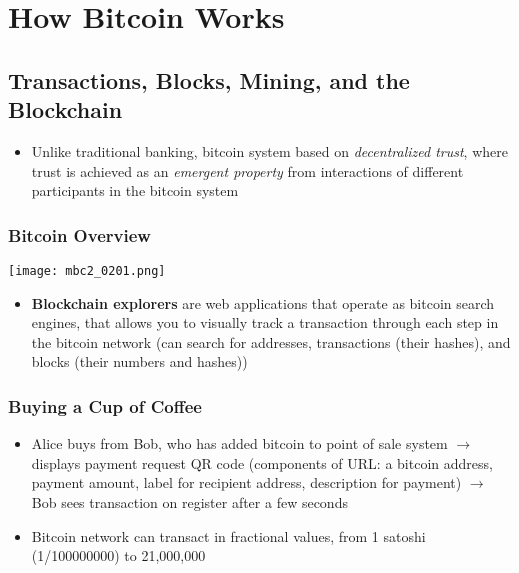 \documentclass[english, 11pt]{article}
\begin{document}



\section{How Bitcoin Works}
\subsection{Transactions, Blocks, Mining, and the Blockchain}
\begin{itemize}
    \item Unlike traditional banking, bitcoin system based on \textit{decentralized trust}, where trust is achieved as an \textit{emergent property} from interactions of different participants in the bitcoin system
\end{itemize}

\subsubsection{Bitcoin Overview}
\begin{tcolorbox}
\begin{minipage}{0.55\linewidth}
    \texttt{[image: mbc2\_0201.png]}
\end{minipage}\hfil
\begin{minipage}{0.36\linewidth}
\begin{itemize}
    \item \textbf{Blockchain explorers} are web applications that operate as bitcoin search engines, that allows you to visually track a transaction through each step in the bitcoin network (can search for addresses, transactions (their hashes), and blocks (their numbers and hashes))
\end{itemize}
\end{minipage}
\end{tcolorbox}

\subsubsection{Buying a Cup of Coffee}
\begin{itemize}
    \item Alice buys from Bob, who has added bitcoin to point of sale system $\rightarrow$ displays payment request QR code (components of URL: a bitcoin address, payment amount, label for recipient address, description for payment) $\rightarrow$ Bob sees transaction on register after a few seconds
    \item Bitcoin network can transact in fractional values, from 1 satoshi (1/100000000) to 21,000,000
\end{itemize}
\end{document}
